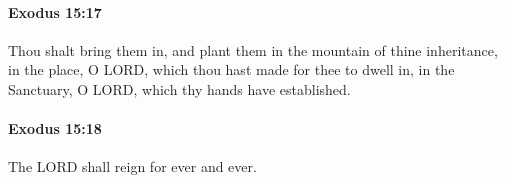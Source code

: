 		\paragraph{Exodus 15:17} %
			\label{EXODUS-15-17}

			Thou shalt bring them in, and plant them in the mountain of thine inheritance, in the place, O LORD, which thou hast made for thee to dwell in, in the Sanctuary, O LORD, which thy hands have established.


		\paragraph{Exodus 15:18} %
			\label{EXODUS-15-18}

			The LORD shall reign for ever and ever.


